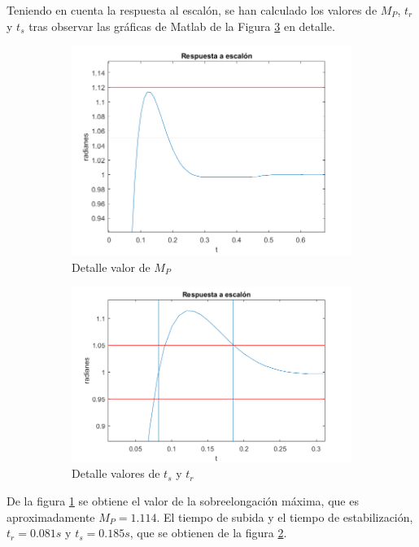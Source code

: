\documentclass[a4paper]{article}
\begin{document}
Teniendo en cuenta la respuesta al escalón, se han calculado los valores de $M_P$, $t_r$ y $t_s$ tras observar las gráficas de Matlab de la Figura \ref{fig:detalle} en detalle.
\begin{center}
	\begin{figure}[htp]
		\begin{subfigure}{1\textwidth}
			\centering
			\includegraphics[width=12cm]{escalon_Mp2}
			\caption{Detalle valor de $M_P$}
			\label{mp3}
		\end{subfigure}
		
		\begin{subfigure}{1\textwidth}
			\centering
			\includegraphics[width=12cm]{escalon_ts_tr2}
			\caption{Detalle valores de $t_s$ y $t_r$}
			\label{fig:tr2}
		\end{subfigure}
		\caption{}
		\label{fig:detalle}
	\end{figure}
\end{center}

De la figura \ref{mp3} se obtiene el valor de la sobreelongación máxima, que es aproximadamente $M_P=1.114$. El tiempo de subida y el tiempo de estabilización, $t_r=0.081 s$ y $t_s=0.185 s$, que se obtienen de la figura \ref{fig:tr2}.
\end{document}
